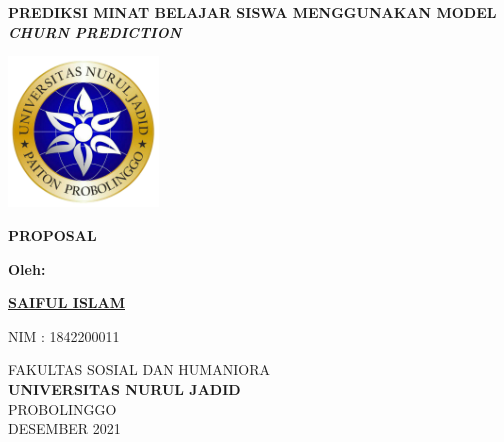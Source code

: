 \begin{titlepage}
   \begin{center}

       \textbf{PREDIKSI MINAT BELAJAR SISWA MENGGUNAKAN MODEL \textit{CHURN PREDICTION}}
       
       \vfill
       
       
       \includegraphics[width=0.3\textwidth]{logo.png}
       \vfill
       
       
       \textbf{PROPOSAL}
       \vfill
       
       \textbf{Oleh:}
       
       \vspace{0.5cm}

       \textbf{\underline{SAIFUL ISLAM}}
       
       NIM : 1842200011

       \vfill
       \vspace{0.5cm}
       FAKULTAS SOSIAL DAN HUMANIORA\\
       \textbf{UNIVERSITAS NURUL JADID}\\
       PROBOLINGGO\\
       DESEMBER 2021
       
       
       
       
   \end{center}
\end{titlepage}